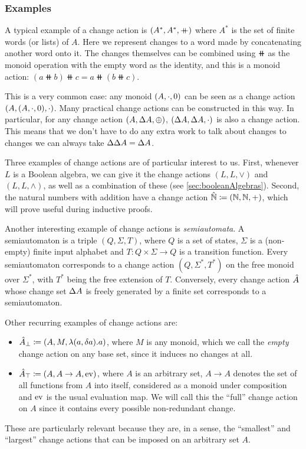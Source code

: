 \subsubsection{Examples}
\label{sec:examples}
A typical example of a change action is $(A^\ast,A^\ast,\mathbin{+\mkern-10mu+})$ where $A^\ast$ is the set of finite words (or lists) of $A$. 
Here we represent changes to a word made by concatenating another word onto it. 
The changes themselves can be combined using $\doubleplus$ as the monoid operation with the empty word as the identity, 
and this is a monoid action: $(a \doubleplus b) \doubleplus c = a \doubleplus \left( b \doubleplus c \right)$.

This is a very common case: any monoid $(A, \cdot, 0)$ can be seen as a change action
$(A,(A, \cdot, 0),\cdot)$. Many practical change actions
can be constructed in this way. In particular, for any change action $(A,\Delta A,\oplus)$,
$(\Delta A,\Delta A,\cdot)$ is also a change action. This means
that we don't have to do any extra work to talk about changes to changes \textemdash{} we can 
always take $\Delta \Delta A = \Delta A$.

Three examples of change actions are of particular interest to us.
First, whenever
$L$ is a Boolean algebra, we can give it the change actions $(L, L, \vee)$ and $(L, L, \wedge)$, 
as well as a combination of these (see \cref{sec:booleanAlgebras}). Second,
the natural numbers with addition have a change action $\hat{\mathbb{N}} \coloneqq (\mathbb{N},
\mathbb{N}, +)$, which will prove useful during inductive proofs.
 
Another interesting example of change actions is \textit{semiautomata}. A semiautomaton is a triple
$(Q, \Sigma, T)$, where $Q$ is a set of states, $\Sigma$ is a (non-empty) finite input alphabet
and $T : Q \times \Sigma \rightarrow Q$ is a transition function. 
Every semiautomaton corresponds to a change action $(Q, \Sigma^*, T^*)$ on the free monoid
over $\Sigma^*$, with $T^*$ being the free extension of $T$. Conversely, every change action $\hat{A}$
whose change set $\Delta A$ is freely generated by a finite set corresponds to a semiautomaton.

Other recurring examples of change actions are:
\begin{itemize}
  \item $\hat{A}_\bot \coloneqq (A,M,\lambda(a, \delta a). a)$, where $M$ is any monoid,
    which we call the \emph{empty} change action on any base set, since it induces no changes at all.
  \item $\hat{A}_\top \coloneqq (A,A \rightarrow A,\operatorname{ev})$, where $A$ is an arbitrary
    set, $A \rightarrow A$ denotes the set of all functions from $A$ into itself, considered as
    a monoid under composition and $\operatorname{ev}$ is the usual evaluation map. We will call this the
    ``full'' change action on $A$ since it contains every possible non-redundant change.
\end{itemize}
These are particularly relevant because they are, in a sense, the ``smallest'' and ``largest''
change actions that can be imposed on an arbitrary set $A$.

